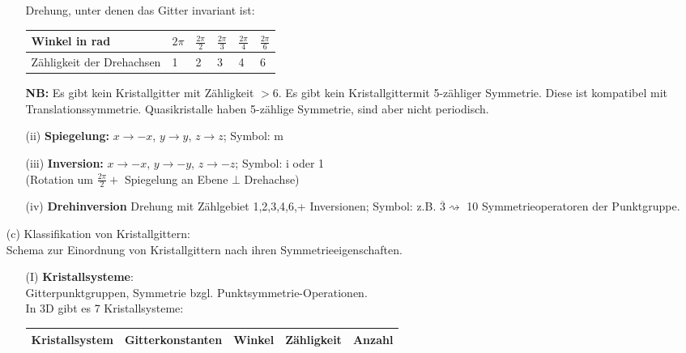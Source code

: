\begin{itemize}
\begin{itemize}
                    Drehung, unter denen das Gitter invariant ist:
                    \begin{table}[H]
                        \centering
                        \begin{tabular}{l|lllll}
                            Winkel in rad             & $2 \pi$ & $\frac{2\pi}{2}$ & $\frac{2\pi}{3}$ & $\frac{2\pi}{4}$ & $\frac{2\pi}{6}$ \\\hline
                            Zähligkeit der Drehachsen & 1       & 2                & 3                & 4                & 6
                        \end{tabular}
                    \end{table}
                    \textbf{NB:} Es gibt kein Kristallgitter mit Zähligkeit $>6$. Es gibt kein Kristallgittermit 5-zähliger Symmetrie. Diese ist kompatibel mit Translationssymmetrie. Quasikristalle haben 5-zählige Symmetrie, sind aber nicht periodisch.
              \item[(ii)] \textbf{Spiegelung:} $x  \rightarrow  -x$, $y  \rightarrow y$, $z  \rightarrow  z$; Symbol: m
              \item[(iii)] \textbf{Inversion:} $x  \rightarrow  -x$, $y  \rightarrow -y$, $z  \rightarrow  -z$; Symbol: i oder 1\\
                    (Rotation um $\frac{2 \pi}{2} +$ Spiegelung an Ebene $\bot$ Drehachse)
              \item[(iv)] \textbf{Drehinversion} Drehung mit Zählgebiet 1,2,3,4,6,+ Inversionen; Symbol: z.B. $\overline{3} \rightsquigarrow $ 10 Symmetrieoperatoren der Punktgruppe.
          \end{itemize}
    \item[(c)] Klassifikation von Kristallgittern: \\
        Schema zur Einordnung von Kristallgittern nach ihren Symmetrieeigenschaften.
        \begin{itemize}
              \item[(I)] \textbf{Kristallsysteme}: \\ Gitterpunktgruppen, Symmetrie bzgl. Punktsymmetrie-Operationen.\\
              In 3D gibt es 7 Kristallsysteme:
              \begin{table}[H]
                \centering
                \begin{tabular}{l|llll}
                  Kristallsystem & Gitterkonstanten & Winkel & Zähligkeit & Anzahl\\\hline

\end{tabular}
\end{table}
\end{itemize}
\end{itemize}
